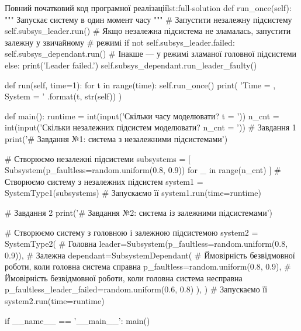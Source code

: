\documentclass[
	a4paper,
	oneside,
	BCOR = 10mm,
	DIV = 12,
	12pt,
	headings = normal,
]{scrartcl}
\begin{document}
\begin{listingpython}[toprule = 0pt, bottomrule = 0pt]{Повний початковий код програмної реалізації}{lst:full-solution}
    def run_once(self):
        """ Запускає систему в один момент часу """
        # Запустити незалежну підсистему
        self.subsys_leader.run()
        # Якщо незалежна підсистема не зламалась, запустити залежну у звичайному
        # режимі
        if not self.subsys_leader.failed:
            self.subsys_dependant.run()
        # Інакше --- у режимі зламаної головної підсистеми
        else:
            print('Leader failed.')
            self.subsys_dependant.run_leader_faulty()

    def run(self, time=1):
        for t in range(time):
            self.run_once()
            print(
                'Time = {}, System = {}'
                .format(t, str(self))
            )


def main():
    runtime = int(input('Скільки часу моделювати? t = '))
    n_cnt = int(input('Скільки незалежних підсистем моделювати? n_cnt = '))
    # Завдання 1
    print('\n# Завдання №1: система з незалежними підсистемами')

    # Створюємо незалежні підсистеми
    subsystems = [
        Subsystem(p_faultless=random.uniform(0.8, 0.9))
        for _ in range(n_cnt)
    ]
    # Створюємо систему з незалежних підсистем
    system1 = SystemType1(subsystems)
    # Запускаємо її
    system1.run(time=runtime)

    # Завдання 2
    print('\n# Завдання №2: система із залежними підсистемами')

    # Створюємо систему з головною і залежною підсистемою
    system2 = SystemType2(
        # Головна
        leader=Subsystem(p_faultless=random.uniform(0.8, 0.9)),
        # Залежна
        dependant=SubsystemDependant(
            # Ймовірність безвідмовної роботи, коли головна система справна
            p_faultless=random.uniform(0.8, 0.9),
            # Ймовірність безвідмовної роботи, коли головна система несправна
            p_faultless_leader_failed=random.uniform(0.6, 0.8)
        ),
    )
    # Запускаємо її
    system2.run(time=runtime)


if __name__ == '__main__':
    main()
			\end{listingpython}
\end{document}
